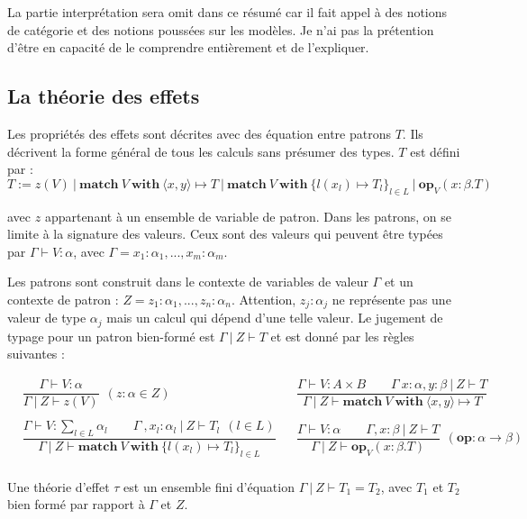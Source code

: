 La partie interprétation sera omit dans ce résumé car il fait appel à des notions de catégorie et des notions poussées sur les modèles. Je n'ai pas la prétention d'être en capacité de le comprendre entièrement et de l'expliquer.

\subsection{La théorie des effets}

	Les propriétés des effets sont décrites avec des équation entre patrons $T$. Ils décrivent la forme général de tous les calculs sans présumer des types. $T$ est défini par :
	\[T := z(V)~|~\textbf{match}~V~\textbf{with}~\langle x,y\rangle \mapsto T~|~\textbf{match}~V~\textbf{with}~\{l(x_l) \mapsto T_l\}_{l \in L}~|~\textbf{op}_V(x:\beta.T)\]
	
	avec $z$ appartenant à un ensemble de variable de patron. Dans les patrons, on se limite à la signature des valeurs. Ceux sont des valeurs qui peuvent être typées par $\Gamma \vdash V:\alpha$, avec $\Gamma = x_1:\alpha_1,...,x_m:\alpha_m$.
	\medbreak
	
	Les patrons sont construit dans le contexte de variables de valeur $\Gamma$ et un contexte de patron : $Z = z_1:\alpha_1,...,z_n:\alpha_n$. Attention, $z_j:\alpha_j$ ne représente pas une valeur de type $\alpha_j$ mais un calcul qui dépend d'une telle valeur.
	Le jugement de typage pour un patron bien-formé est $\Gamma~|~Z \vdash T$ et est donné par les règles suivantes :
	
	\begin{align*}
		&\dfrac{\Gamma \vdash V:\alpha}{\Gamma~|~Z \vdash z(V)}~~(z:\alpha \in Z) &
		&\dfrac{\Gamma \vdash V : A \times B\quad\quad\Gamma~x:\alpha,y:\beta~|~Z \vdash T}{\Gamma~|~Z \vdash \textbf{match}~V~\textbf{with}~\langle x,y\rangle  \mapsto T} \\\\
		&\dfrac{\Gamma \vdash V : \sum_{l \in L}\alpha_l\quad\quad\Gamma~,x_l:\alpha_l~|~Z \vdash T_l~~(l\in L)}{\Gamma~|~Z \vdash \textbf{match}~V~\textbf{with}~\{ l(x_l) \mapsto T_l\}_{l \in L}} &
		&\dfrac{\Gamma \vdash V:\alpha\quad\quad\Gamma,x:\beta~|~Z \vdash T}{\Gamma~|~Z \vdash \textbf{op}_V(x:\beta.T)}~~(\textbf{op}:\alpha \rightarrow \beta)\\
	\end{align*}
	
	Une théorie d'effet $\tau$ est un ensemble fini d'équation $\Gamma~|~Z \vdash T_1 = T_2$, avec $T_1$ et $T_2$ bien formé par rapport à $\Gamma$ et $Z$.
	
